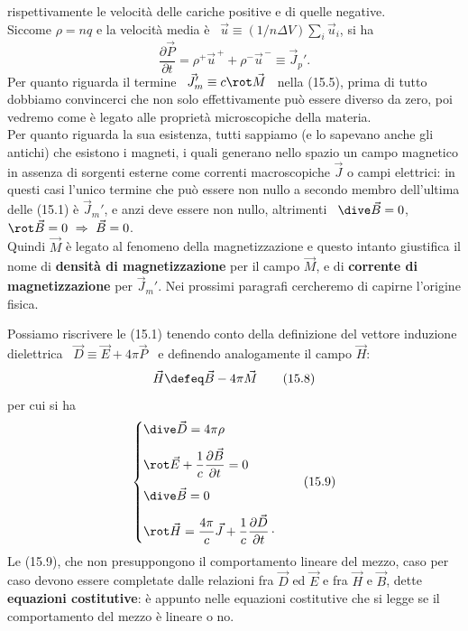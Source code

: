 rispettivamente le velocit\`a delle cariche positive e di quelle negative.\\
Siccome $\rho=nq$ e la velocit\`a media \`e
\ $\vec u\equiv(1/n\Delta V)\sum_i\vec u_i$, si ha
\begin{equation}
  \frac{\partial\vec P}{\partial t}
  =\rho^+\vec u^{\,+}+\rho^-\vec u^{\,-}\equiv\vec J_p'.
  \tag{15.7}
\end{equation}
Per quanto riguarda il termine \ $\vec J_m'\equiv c\rot\vec M$ \ nella (15.5),
prima di tutto dobbiamo convincerci che non solo effettivamente pu\`o essere
diverso da zero, poi vedremo come
\`e legato alle propriet\`a microscopiche della materia.\\
Per quanto riguarda la sua esistenza, tutti sappiamo (e lo sapevano anche gli
antichi) che esistono i magneti, i quali generano nello spazio un campo
magnetico in assenza di sorgenti esterne come correnti macroscopiche $\vec J$ o
campi elettrici: in questi casi l'unico termine che pu\`o essere non nullo a
secondo membro dell'ultima delle (15.1) \`e $\vec J_m'$, e anzi deve essere non
nullo, altrimenti \ $\dive\vec B=0$, $\rot\vec B=0\ \Rightarrow\ \vec B=0$.\\
Quindi $\vec M$ \`e legato al fenomeno della magnetizzazione e questo intanto
giustifica il nome di \textbf{densit\`a di magnetizzazione} per il campo
$\vec M$, e di \textbf{corrente di magnetizzazione} per $\vec J_m'$. Nei
prossimi paragrafi cercheremo di capirne l'origine fisica.

Possiamo riscrivere le (15.1) tenendo conto della definizione del vettore
induzione dielettrica \ $\vec D\equiv\vec E+4\pi\vec P$ \ e definendo
analogamente il campo $\vec H$:
\begin{equation}
  \vec H\defeq\vec B-4\pi\vec M
  \tag{15.8}
\end{equation}
per cui si ha
\begin{equation}
  \left\{\begin{aligned}
    &\dive\vec D=4\pi\rho\\[4pt]
    &\rot\vec E+\frac{1}{c}\frac{\partial\vec B}{\partial t}=0\\[4pt]
    &\dive\vec B=0\\[4pt]
    &\rot\vec H=\frac{4\pi}{c}\vec J
    +\frac{1}{c}\frac{\partial\vec D}{\partial t}\,\cdot
  \end{aligned}\right.
  \tag{15.9}
\end{equation}
Le (15.9), che non presuppongono il comportamento lineare del mezzo, caso per
caso devono essere completate dalle relazioni fra $\vec D$ ed $\vec E$ e fra
$\vec H$ e $\vec B$, dette \textbf{equazioni costitutive}: \`e appunto nelle
equazioni costitutive che si legge se il comportamento del mezzo \`e lineare o
no.

